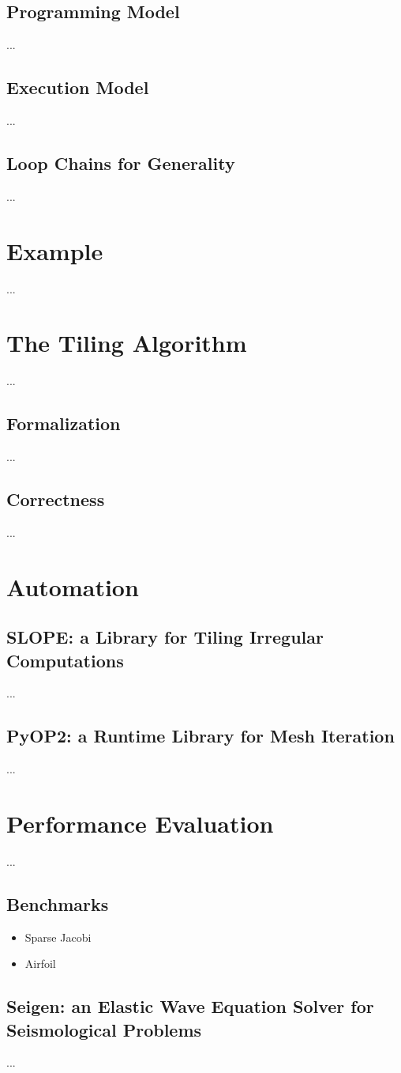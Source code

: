 \subsection{Programming Model}
...

\subsection{Execution Model}
...

\subsection{Loop Chains for Generality}
...

\section{Example}
...

\section{The Tiling Algorithm}
...

\subsection{Formalization}
...

\subsection{Correctness}
...


\section{Automation}

\subsection{SLOPE: a Library for Tiling Irregular Computations}
...

\subsection{PyOP2: a Runtime Library for Mesh Iteration}
...

\section{Performance Evaluation}
...

\subsection{Benchmarks}
\begin{itemize}
\item Sparse Jacobi
\item Airfoil
\end{itemize}

\subsection{Seigen: an Elastic Wave Equation Solver for Seismological Problems}
\label{sec:tiling:seigen}
...